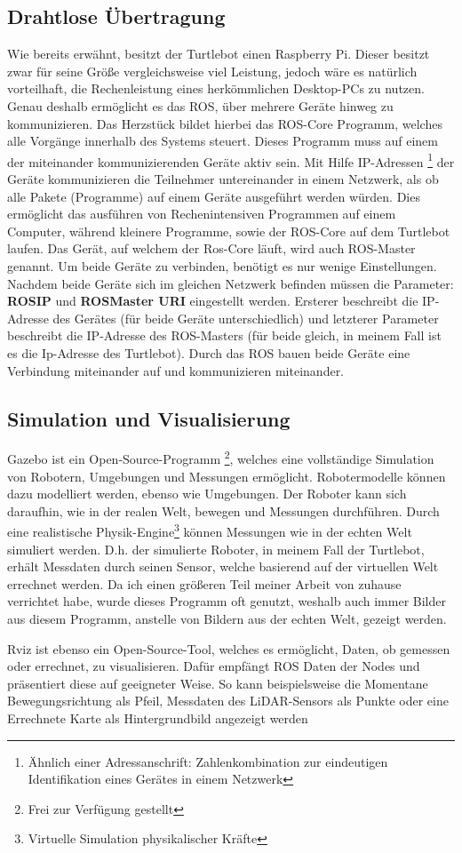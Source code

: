 {	\subsection{Drahtlose Übertragung}
	{ Wie bereits erwähnt, besitzt der Turtlebot einen Raspberry Pi. Dieser besitzt zwar für seine Größe vergleichsweise viel Leistung, jedoch wäre es natürlich vorteilhaft, die Rechenleistung eines herkömmlichen Desktop-PCs zu nutzen. Genau deshalb ermöglicht es das ROS, über mehrere Geräte hinweg zu kommunizieren. Das Herzstück bildet hierbei das ROS-Core Programm, welches alle Vorgänge innerhalb des Systems steuert. Dieses Programm muss auf einem der miteinander kommunizierenden Geräte aktiv sein. Mit Hilfe IP-Adressen \footnote{Ähnlich einer Adressanschrift: Zahlenkombination zur eindeutigen Identifikation eines Gerätes in einem Netzwerk} der Geräte kommunizieren die Teilnehmer untereinander in einem Netzwerk, als ob alle Pakete (Programme) auf einem Geräte ausgeführt werden würden. Dies ermöglicht das ausführen von Rechenintensiven Programmen auf einem Computer, während kleinere Programme, sowie der ROS-Core auf dem Turtlebot laufen. Das Gerät, auf welchem der Ros-Core läuft, wird auch ROS-Master genannt. Um beide Geräte zu verbinden, benötigt es nur wenige Einstellungen. Nachdem beide Geräte sich im gleichen Netzwerk befinden müssen die Parameter: \textbf{ROS\textunderscore IP} und \textbf{ROS\textunderscore Master \textunderscore URI} eingestellt werden. Ersterer beschreibt die IP-Adresse des Gerätes (für beide Geräte unterschiedlich) und letzterer Parameter beschreibt die IP-Adresse des ROS-Masters (für beide gleich, in meinem Fall ist es die Ip-Adresse des Turtlebot). Durch das ROS bauen beide Geräte eine Verbindung miteinander auf und kommunizieren miteinander.
	}
	
	\subsection{Simulation und Visualisierung}
	{
		Gazebo ist ein Open-Source-Programm \footnote{Frei zur Verfügung gestellt}, welches eine vollständige Simulation von Robotern, Umgebungen und Messungen ermöglicht. Robotermodelle können dazu modelliert werden, ebenso wie Umgebungen. Der Roboter kann sich daraufhin, wie in der realen Welt, bewegen und Messungen durchführen. Durch eine realistische Physik-Engine\footnote{Virtuelle Simulation physikalischer Kräfte} können Messungen wie in der echten Welt simuliert werden. D.h. der simulierte Roboter, in meinem Fall der Turtlebot, erhält Messdaten durch seinen Sensor, welche basierend auf der virtuellen Welt errechnet werden. Da ich einen größeren Teil meiner Arbeit von zuhause verrichtet habe, wurde dieses Programm oft genutzt, weshalb auch immer Bilder aus diesem Programm, anstelle von Bildern aus der echten Welt, gezeigt werden.
		
		Rviz ist ebenso ein Open-Source-Tool, welches es ermöglicht, Daten, ob gemessen oder errechnet, zu visualisieren. Dafür empfängt ROS Daten der Nodes und präsentiert diese auf geeigneter Weise. So kann beispielsweise die Momentane Bewegungsrichtung als Pfeil, Messdaten des LiDAR-Sensors als Punkte oder eine Errechnete Karte als Hintergrundbild angezeigt werden
		
		
	}
}